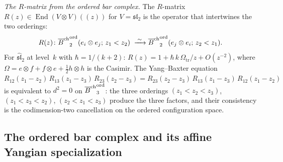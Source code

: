 \begin{computation}
\emph{The $R$-matrix from the ordered bar complex.}
The $R$-matrix $R(z)\in\operatorname{End}(V\otimes V)(\!(z)\!)$
for $V=\mathfrak{sl}_2$ is the operator that intertwines
the two orderings:
\[
R(z)\colon
{\overline{B}^{\mathrm{ch}}}^{\mathrm{ord}}_2(e_i\otimes e_j;\,z_1<z_2)
\;\xrightarrow{\;\sim\;}
{\overline{B}^{\mathrm{ch}}}^{\mathrm{ord}}_2(e_j\otimes e_i;\,z_2<z_1).
\]
For $\widehat{\mathfrak{sl}}_2$ at level~$k$ with
$\hbar=1/(k+2)$:
$R(z)=1+\hbar\,k\,\Omega_{\mathrm{tr}}/z+O(z^{-2})$, where
$\Omega=e\otimes f+f\otimes e+\tfrac12 h\otimes h$
is the Casimir. The Yang--Baxter equation
$R_{12}(z_1{-}z_2)\,R_{13}(z_1{-}z_3)\,
R_{23}(z_2{-}z_3)
=R_{23}(z_2{-}z_3)\,R_{13}(z_1{-}z_3)\,
R_{12}(z_1{-}z_2)$
is equivalent to $d^2=0$ on
${\overline{B}^{\mathrm{ch}}}^{\mathrm{ord}}_3$: the three orderings
$(z_1<z_2<z_3)$, $(z_1<z_3<z_2)$, $(z_2<z_1<z_3)$
produce the three factors, and their consistency is
the codimension-two cancellation on the ordered
configuration space.
\end{computation}

\subsection{The ordered bar complex and its affine Yangian specialization}

